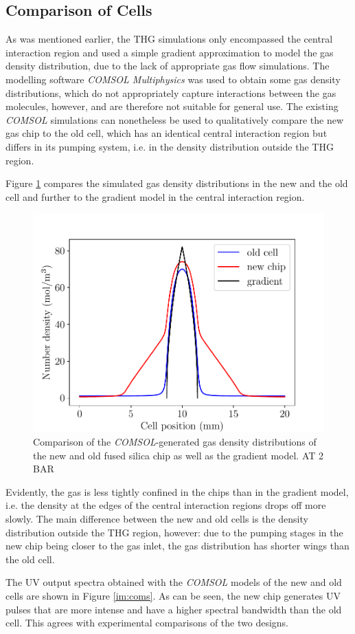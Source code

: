 \documentclass[a4paper]{jpconf}
\begin{document}
\subsection{Comparison of Cells}
As was mentioned earlier, the THG simulations only encompassed the central interaction region and used a simple gradient approximation to model the gas density distribution, due to the lack of appropriate gas flow simulations. The modelling software \textit{COMSOL Multiphysics} was used to obtain some gas density distributions, which do not appropriately capture interactions between the gas molecules, however, and are therefore not suitable for general use. The existing \textit{COMSOL} simulations can nonetheless be used to qualitatively compare the new gas chip to the old cell, which has an identical central interaction region but differs in its pumping system, i.e. in the density distribution outside the THG region. \par 
Figure \ref{im:dens} compares the simulated gas density distributions in the new and the old cell and further to the gradient model in the central interaction region. 
\begin{figure}[h]
\centering
\includegraphics[width=0.5 \textwidth]{im/old_new_comp}
\caption{Comparison of the \textit{COMSOL}-generated gas density distributions of the new and old fused silica chip as well as the gradient model. AT 2 BAR}\label{im:dens}
\end{figure}
Evidently, the gas is less tightly confined in the chips than in the gradient model, i.e. the density at the edges of the central interaction regions drops off more slowly. The main difference between the new and old cells is the density distribution outside the THG region, however: due to the pumping stages in the new chip being closer to the gas inlet, the gas distribution has shorter wings than the old cell. \par 
The UV output spectra obtained with the \textit{COMSOL} models of the new and old cells are shown in Figure \ref{im:coms}. As can be seen, the new chip generates UV pulses that are more intense and have a higher spectral bandwidth than the old cell. This agrees with experimental comparisons of the two designs. \par 
\end{document}
